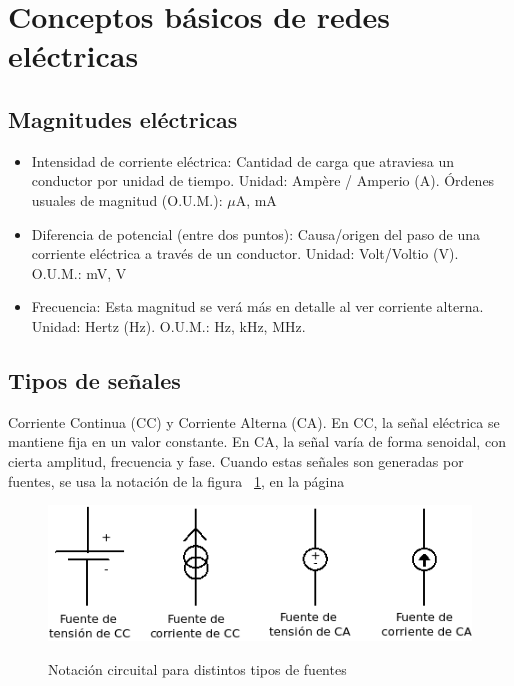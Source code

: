 \documentclass{article}
\begin{document}
\setcounter{section}{-1}
\section{Conceptos básicos de redes eléctricas}

\subsection{Magnitudes eléctricas}

\begin{itemize}
	\item Intensidad de corriente eléctrica: Cantidad de carga que atraviesa un conductor por unidad de tiempo. Unidad: Ampère / Amperio (A). Órdenes usuales de magnitud (O.U.M.): $\mu$A, mA
	\item Diferencia de potencial (entre dos puntos): Causa/origen del paso de una corriente eléctrica a través
	de un conductor. Unidad: Volt/Voltio (V). O.U.M.: mV, V
	\item Frecuencia: Esta magnitud se verá más en detalle al ver corriente alterna. Unidad: Hertz (Hz).
	 O.U.M.: Hz, kHz, MHz.
\end{itemize}

\subsection{Tipos de señales}

Corriente Continua (CC) y Corriente Alterna (CA). En CC, la señal eléctrica se mantiene fija en un valor constante.
En CA, la señal varía de forma senoidal, con cierta amplitud, frecuencia y fase. Cuando estas señales son
generadas por fuentes, se usa la notación de la figura ~\ref{fig:fuentes}, en la página \pageref{fig:fuentes}

\begin{figure}[t]
\caption{Notación circuital para distintos tipos de fuentes}
\includegraphics[scale=0.75]{img/teo_fig001_fuentes.png} 
\centering
\label{fig:fuentes}
\end{figure}
\end{document}
